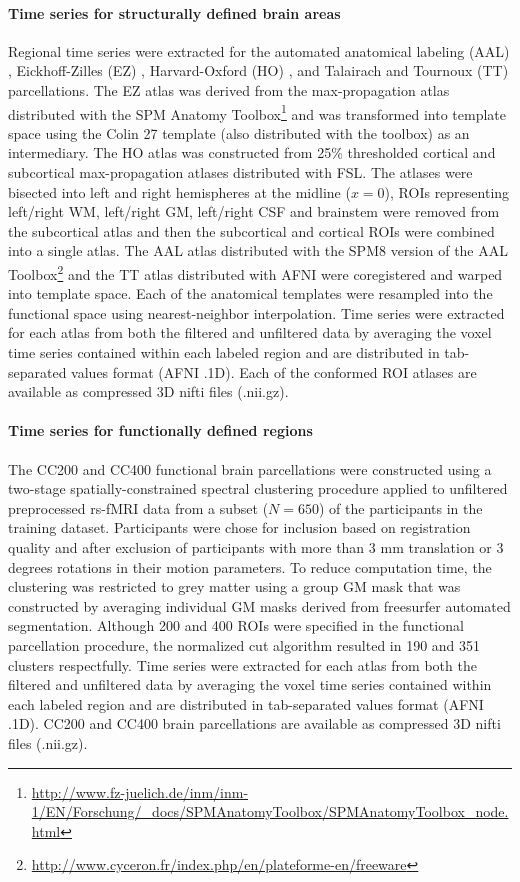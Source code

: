 \documentclass[preprint,12pt,5p]{elsarticle}
\begin{document}
\begin{itemize}
\paragraph{Time series for structurally defined brain areas} Regional time series were extracted for the automated anatomical labeling (AAL) \cite{tzourio2002automated}, Eickhoff-Zilles (EZ) \cite{eickhoff2005new}, Harvard-Oxford (HO) \cite{HO_atlas_1, HO_atlas_2, HO_atlas_3, HO_atlas_4}, and Talairach and Tournoux (TT) \cite{lancaster2000automated} parcellations. The EZ atlas was derived from the max-propagation atlas distributed with the SPM Anatomy Toolbox\footnote{\url{http://www.fz-juelich.de/inm/inm-1/EN/Forschung/_docs/SPMAnatomyToolbox/SPMAnatomyToolbox_node.html}} and was transformed into template space using the Colin 27 template (also distributed with the toolbox) as an intermediary. The HO atlas was constructed from 25\% thresholded cortical and subcortical max-propagation atlases distributed with FSL. The atlases were bisected into left and right hemispheres at the midline ($x=0$), ROIs representing left/right WM, left/right GM, left/right CSF and brainstem were removed from the subcortical atlas and then the subcortical and cortical ROIs were combined into a single atlas. The AAL atlas distributed with the SPM8 version of the AAL Toolbox\footnote{\url{http://www.cyceron.fr/index.php/en/plateforme-en/freeware}} and the TT atlas distributed with AFNI were coregistered and warped into template space. Each of the anatomical templates were resampled into the functional space using nearest-neighbor interpolation. Time series were extracted for each atlas from both the filtered and unfiltered data by averaging the voxel time series contained within each labeled region and are distributed in tab-separated values format (AFNI .1D). Each of the conformed ROI atlases are available as compressed 3D nifti files (.nii.gz).

\paragraph{Time series for functionally defined regions} The CC200 and CC400 functional brain parcellations were constructed using a two-stage spatially-constrained spectral clustering procedure \cite{craddock2012whole} applied to unfiltered preprocessed rs-fMRI data from a subset ($N=650$) of the participants in the training dataset. Participants were chose for inclusion based on registration quality and after exclusion of participants with more than 3 mm translation or 3 degrees rotations in their motion parameters. To reduce computation time, the clustering was restricted to grey matter using a group GM mask that was constructed by averaging individual GM masks derived from freesurfer automated segmentation. Although 200 and 400 ROIs were specified in the functional parcellation procedure, the normalized cut algorithm resulted in 190 and 351 clusters respectfully. Time series were extracted for each atlas from both the filtered and unfiltered data by averaging the voxel time series contained within each labeled region and are distributed in tab-separated values format (AFNI .1D). CC200 and CC400 brain parcellations are available as compressed 3D nifti files (.nii.gz).


\end{itemize}
\end{document}
